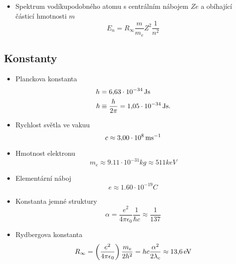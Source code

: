 \begin{itemize}
    \item Spektrum vodíkupodobného atomu s centrálním nábojem $Ze$ a obíhající částicí hmotnosti $m$
        \begin{equation}
            E_{n}=R_{\infty}\frac{m}{m_{e}}Z^{2}\frac{1}{n^{2}}
        \end{equation}

\end{itemize}

\subsection{Konstanty}
\begin{itemize}
    \item Planckova konstanta
        \begin{align}
            h&=6,\!63\cdot 10^{-34}\,\mathrm{{Js}}\\
            \hbar&\equiv\frac{h}{2\pi}=1,\!05\cdot 10^{-34}\,\mathrm{{Js}}.
        \end{align}

    \item Rychlost světla ve vakuu
        \begin{equation}
            c\approx 3,\!00\cdot 10^{8}\,\mathrm{{ms^{-1}}}
        \end{equation}
    
    \item Hmotnost elektronu
        \begin{equation}
            m_{e}\approx 9.11\cdot 10^{-31}\unit{kg}\approx 511\unit{keV}
        \end{equation}

    \item Elementární náboj
        \begin{equation}
            e\approx 1.60\cdot 10^{-19}\unit{C}
        \end{equation}

    \item Konstanta jemné struktury
        \begin{equation}
            \alpha=\frac{e^{2}}{4\pi\epsilon_{0}}\frac{1}{\hbar c}\approx\frac{1}{137}
        \end{equation}

    \item Rydbergova konstanta
        \begin{equation}
            R_{\infty}=\left(\frac{e^{2}}{4\pi\epsilon_{0}}\right)\frac{m_{e}}{2h^{2}}=hc\frac{\alpha^{2}}{2\lambda_{c}}\approx 13,\!6\,\mathrm{{eV}}
        \end{equation}


\end{itemize}

